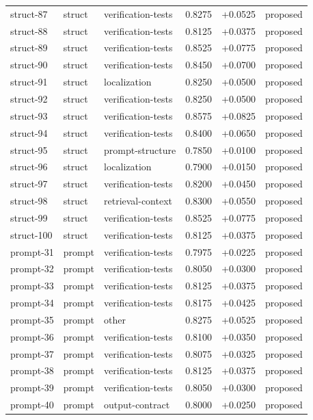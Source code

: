 \begin{center}
\begin{longtable}{llp{5.2cm}rrl}
struct-87 & struct & verification-tests & 0.8275 & +0.0525 & proposed \\
struct-88 & struct & verification-tests & 0.8125 & +0.0375 & proposed \\
struct-89 & struct & verification-tests & 0.8525 & +0.0775 & proposed \\
struct-90 & struct & verification-tests & 0.8450 & +0.0700 & proposed \\
struct-91 & struct & localization & 0.8250 & +0.0500 & proposed \\
struct-92 & struct & verification-tests & 0.8250 & +0.0500 & proposed \\
struct-93 & struct & verification-tests & 0.8575 & +0.0825 & proposed \\
struct-94 & struct & verification-tests & 0.8400 & +0.0650 & proposed \\
struct-95 & struct & prompt-structure & 0.7850 & +0.0100 & proposed \\
struct-96 & struct & localization & 0.7900 & +0.0150 & proposed \\
struct-97 & struct & verification-tests & 0.8200 & +0.0450 & proposed \\
struct-98 & struct & retrieval-context & 0.8300 & +0.0550 & proposed \\
struct-99 & struct & verification-tests & 0.8525 & +0.0775 & proposed \\
struct-100 & struct & verification-tests & 0.8125 & +0.0375 & proposed \\
prompt-31 & prompt & verification-tests & 0.7975 & +0.0225 & proposed \\
prompt-32 & prompt & verification-tests & 0.8050 & +0.0300 & proposed \\
prompt-33 & prompt & verification-tests & 0.8125 & +0.0375 & proposed \\
prompt-34 & prompt & verification-tests & 0.8175 & +0.0425 & proposed \\
prompt-35 & prompt & other & 0.8275 & +0.0525 & proposed \\
prompt-36 & prompt & verification-tests & 0.8100 & +0.0350 & proposed \\
prompt-37 & prompt & verification-tests & 0.8075 & +0.0325 & proposed \\
prompt-38 & prompt & verification-tests & 0.8125 & +0.0375 & proposed \\
prompt-39 & prompt & verification-tests & 0.8050 & +0.0300 & proposed \\
prompt-40 & prompt & output-contract & 0.8000 & +0.0250 & proposed \\

\end{longtable}
\end{center}
